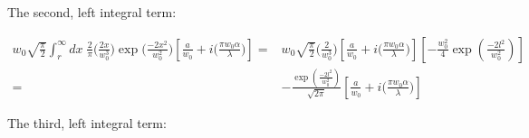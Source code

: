 \documentclass[aps,twoside,secnumarabic,balancelastpage,amsmath,amssymb,nofootinbib,hyperref=pdftex]{revtex4}
\begin{document}
The second, left integral term:

\begin{align*}
w_0 \sqrt{ \frac{\pi}{2} }   \int_{r}^{\infty} dx \;
\frac{2}{\pi}
\Big( \frac{2 x}{w_0^3} \Big)
		\exp \big( \frac{-2 x^2}{w_0^{2}} \big)	
        			\left[
			\frac{a}{w_{0}}		
			+
			i  \big( \frac{\pi w_{0} \alpha}{\lambda} \big)
			\right]
    =&
       w_0 \sqrt{ \frac{\pi}{2} } 
        \Big( \frac{2 }{w_0^3} \Big)	
        	\left[
                \frac{a}{w_{0}}		
                +
                i  \big( \frac{\pi w_{0} \alpha}{\lambda} \big)
			\right] 
            \left[
                -\frac{w_0^2}{4}
                \exp( \frac{-2l^2}{w_0^2})
            \right]
       \\ =&
       -
       \frac{\exp( \frac{-2l^2}{w_0^2})}{\sqrt{2 \pi}}
        	\left[
                \frac{a}{w_{0}}		
                +
                i  \big( \frac{\pi w_{0} \alpha}{\lambda} \big)
			\right] 
\end{align*}

The third, left integral term:
\end{document}
